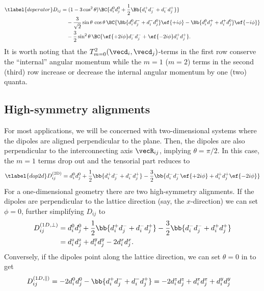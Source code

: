 \begin{align}\tlabel{doperator}
    D_{ij} &= (1-3\cos^2 \theta) \BC{ d_i^0 d_j^0 + \frac{1}{2}\Bb{d_i^+ d_j^- + d_i^- d_j^+} } \\
           &\quad -\frac{3}{\sqrt{2}}\sin\theta \,\cos\theta\, \BC{ \Bb{ d_i^0 d_j^- + d_i^- d_j^0 } \ef{+i\phi} - \Bb{ d_i^0 d_j^+ + d_i^+ d_j^0 } \ef{-i\phi} } \\
           &\quad -\frac{3}{2}\sin^2\theta \, \BC{ \ef{+2i\phi} d_i^- d_j^- + \ef{-2i\phi} d_i^+ d_j^+ }.
\end{align}
It is worth noting that the $T^2_{m=0}(\vecd_i, \vecd_j)$-terms in the first row conserve the ``internal'' angular momentum while the $m=1$ ($m=2$) terms in the second (third) row increase or decrease the internal angular momentum by one (two) quanta.

\subsection{High-symmetry alignments}
For most applications, we will be concerned with two-dimensional systems where the dipoles are aligned perpendicular to the plane. Then, the dipoles are also perpendicular to the interconnecting axis $\vecR_{ij}$, implying $\theta = \pi/2$. In this case, the $m=1$ terms drop out and the tensorial part reduces to
\begin{align} \tlabel{dop2d}
    D^\text{(2D)}_{ij} = d_i^0 d_j^0 + \frac{1}{2}\bb{d_i^+ d_j^- + d_i^- d_j^+} -\frac{3}{2} \bb{ d_i^- d_j^- \ef{+2i\phi} + d_i^+ d_j^+ \ef{-2i\phi} }
\end{align}
For a one-dimensional geometry there are two high-symmetry alignments. If the dipoles are perpendicular to the lattice direction (say, the $x$-direction) we can set $\phi=0$, further simplifying $D_{ij}$ to
\begin{align}
    D_{ij}^{(1D,\perp)} &= d_i^0 d_j^0 + \frac{1}{2}\bb{d_i^+ d_j^- + d_i^- d_j^+} -\frac{3}{2} \bb{d_i^- d_j^- + d_i^+ d_j^+} \\
 &= d_i^z d_j^z + d_i^y d_j^y - 2 d_i^x d_j^x.
\end{align}
Conversely, if the dipoles point along the lattice direction, we can set $\theta=0$ in  to get
\begin{align}
    D^{(1D,\parallel)}_{ij} &= -2 d_i^0 d_j^0 - \bb{d_i^+ d_j^- + d_i^- d_j^+} = -2 d_i^z d_j^z+ d_i^x d_j^x + d_i^y d_j^y
\end{align}

